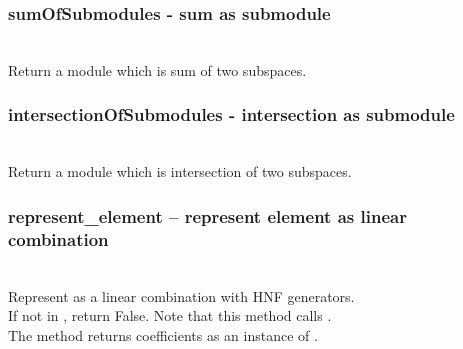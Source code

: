   \subsubsection{sumOfSubmodules - sum as submodule}
   \\
   \spacing
   \quad Return a module which is sum of two subspaces.\\
   \spacing
  \subsubsection{intersectionOfSubmodules - intersection as submodule}
   \\
   \spacing
   \quad Return a module which is intersection of two subspaces.\\
   \spacing
 \subsubsection{represent\_element -- represent element as linear combination}
   \\
   \spacing
   \quad Represent  as a linear combination with HNF generators.\\
   \spacing
   \quad If  not in , return False.
   Note that this method calls .\\
   \spacing
   \quad The method returns coefficients as an instance of .
